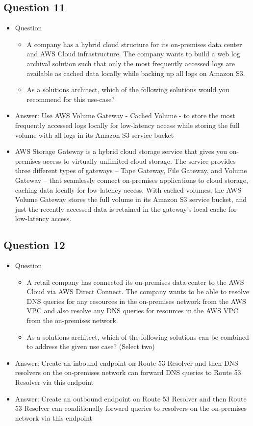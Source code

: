 \documentclass[]{scrartcl}
\begin{document}
\subsection{Question 11}
\begin{itemize}
	\item Question
	\begin{itemize}
		\item A company has a hybrid cloud structure for its on-premises data center and AWS Cloud infrastructure. The company wants to build a web log archival solution such that only the most frequently accessed logs are available as cached data locally while backing up all logs on Amazon S3.
		\item As a solutions architect, which of the following solutions would you recommend for this use-case?
	\end{itemize}
	\item Answer: Use AWS Volume Gateway - Cached Volume - to store the most frequently accessed logs locally for low-latency access while storing the full volume with all logs in its Amazon S3 service bucket
	\item AWS Storage Gateway is a hybrid cloud storage service that gives you on-premises access to virtually unlimited cloud storage. The service provides three different types of gateways – Tape Gateway, File Gateway, and Volume Gateway – that seamlessly connect on-premises applications to cloud storage, caching data locally for low-latency access. With cached volumes, the AWS Volume Gateway stores the full volume in its Amazon S3 service bucket, and just the recently accessed data is retained in the gateway’s local cache for low-latency access.
\end{itemize}

\subsection{Question 12}
\begin{itemize}
	\item Question
	\begin{itemize}
		\item A retail company has connected its on-premises data center to the AWS Cloud via AWS Direct Connect. The company wants to be able to resolve DNS queries for any resources in the on-premises network from the AWS VPC and also resolve any DNS queries for resources in the AWS VPC from the on-premises network.
		\item As a solutions architect, which of the following solutions can be combined to address the given use case? (Select two)
	\end{itemize}
	\item Answer: Create an inbound endpoint on Route 53 Resolver and then DNS resolvers on the on-premises network can forward DNS queries to Route 53 Resolver via this endpoint
	\item Answer: Create an outbound endpoint on Route 53 Resolver and then Route 53 Resolver can conditionally forward queries to resolvers on the on-premises network via this endpoint
\end{itemize}
\end{document}

